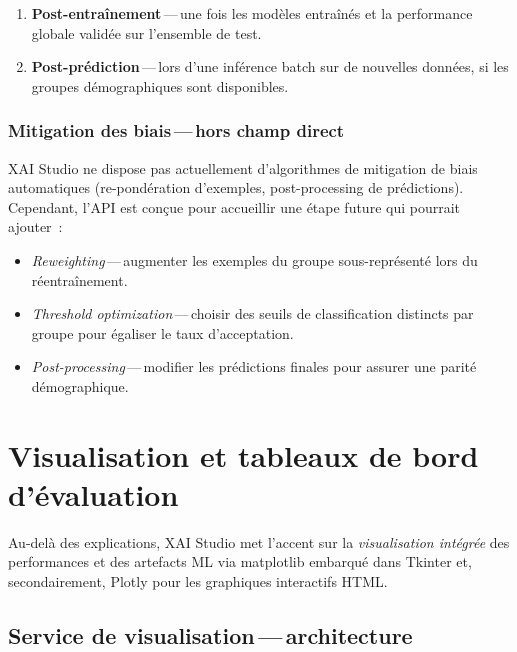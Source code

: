 \documentclass[11pt,a4paper]{report}
\begin{document}
\begin{enumerate}
    \item \textbf{Post-entra\^inement}\,---\,une fois les mod\`eles entra\^in\'es
        et la performance globale valid\'ee sur l'ensemble de test.
    \item \textbf{Post-pr\'ediction}\,---\,lors d'une inf\'erence batch sur
        de nouvelles donn\'ees, si les groupes d\'emographiques sont
        disponibles.
\end{enumerate}

\subsection{Mitigation des biais\,---\,hors champ direct}

XAI Studio ne dispose pas actuellement d'algorithmes de mitigation
de biais automatiques (re-pond\'eration d'exemples, post-processing
de pr\'edictions). Cependant, l'API est con\c{c}ue pour accueillir
une \'etape future qui pourrait ajouter~:

\begin{itemize}
    \item \textit{Reweighting}\,---\,augmenter les exemples du groupe
        sous-repr\'esent\'e lors du r\'eentra\^inement.
    \item \textit{Threshold optimization}\,---\,choisir des seuils de
        classification distincts par groupe pour \'egaliser le taux
        d'acceptation.
    \item \textit{Post-processing}\,---\,modifier les pr\'edictions finales
        pour assurer une parit\'e d\'emographique.
\end{itemize}

\chapter{Visualisation et tableaux de bord d'\'evaluation}

Au-del\`a des explications, XAI Studio met l'accent sur la
\textit{visualisation int\'egr\'ee} des performances et des artefacts
ML via matplotlib embarqu\'e dans Tkinter et, secondairement, Plotly
pour les graphiques interactifs HTML.

\section{Service de visualisation\,---\,architecture}
\end{document}
